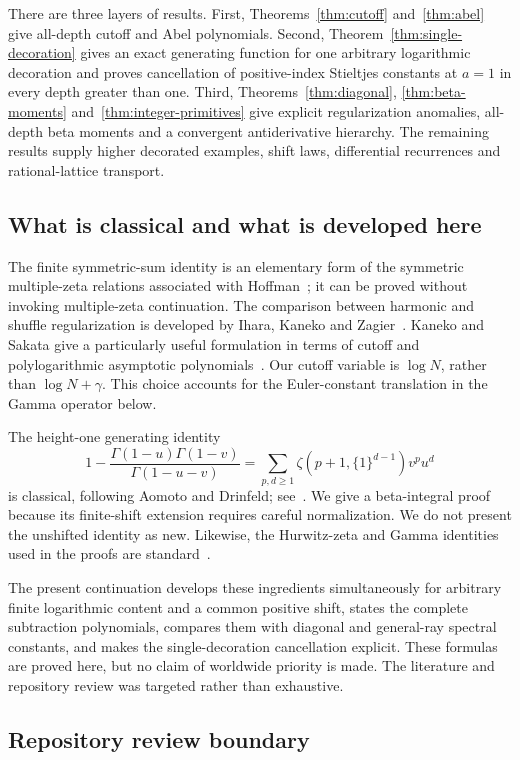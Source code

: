 \documentclass[11pt,oneside]{article}
\numberwithin{equation}{section}
\theoremstyle{definition}
\theoremstyle{remark}
\begin{document}
There are three layers of results. First, Theorems~\ref{thm:cutoff}
and~\ref{thm:abel} give all-depth cutoff and Abel polynomials. Second,
Theorem~\ref{thm:single-decoration} gives an exact generating function for one
arbitrary logarithmic decoration and proves cancellation of positive-index
Stieltjes constants at $a=1$ in every depth greater than one. Third,
Theorems~\ref{thm:diagonal}, \ref{thm:beta-moments} and~\ref{thm:integer-primitives}
give explicit regularization anomalies, all-depth beta moments and a
convergent antiderivative hierarchy.
The remaining results supply higher decorated examples, shift laws,
differential recurrences and rational-lattice transport.

\subsection{What is classical and what is developed here}

The finite symmetric-sum identity is an elementary form of the symmetric
multiple-zeta relations associated with Hoffman~\cite{Hoffman}; it can be
proved without invoking multiple-zeta continuation. The comparison between
harmonic and shuffle regularization is developed by Ihara, Kaneko and
Zagier~\cite{IKZ}. Kaneko and Sakata give a particularly useful formulation in
terms of cutoff and polylogarithmic asymptotic polynomials~\cite{KS}. Our
cutoff variable is $\log N$, rather than $\log N+\gamma$. This choice accounts
for the Euler-constant translation in the Gamma operator below.

The height-one generating identity
\[
1-\frac{\Gamma(1-u)\Gamma(1-v)}{\Gamma(1-u-v)}
=\sum_{p,d\ge1}\zeta(p+1,\{1\}^{d-1})v^p u^d
\]
is classical, following Aomoto and Drinfeld; see~\cite{Aomoto,Drinfeld,KS}.
We give a beta-integral proof because its finite-shift extension requires
careful normalization. We do not present the unshifted identity as new.
Likewise, the Hurwitz-zeta and Gamma identities used in the proofs are
standard~\cite{DLMF}.

The present continuation develops these ingredients simultaneously for
arbitrary finite logarithmic content and a common positive shift, states the
complete subtraction polynomials, compares them with diagonal and general-ray
spectral constants, and makes the single-decoration cancellation explicit.
These formulas are proved here, but no claim of worldwide priority is made.
The literature and repository review was targeted rather than exhaustive.

\subsection{Repository review boundary}
\end{document}
